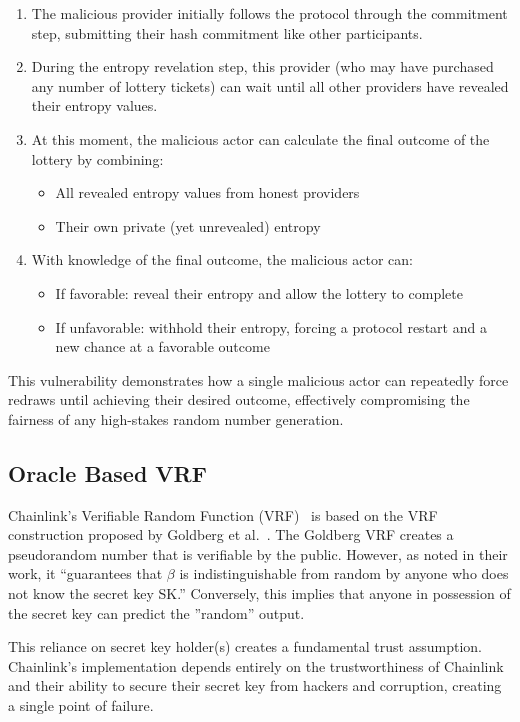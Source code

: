 \begin{enumerate}
    \item The malicious provider initially follows the protocol through the commitment step, submitting their hash commitment like other participants.
    
    \item During the entropy revelation step, this provider (who may have purchased any number of lottery tickets) can wait until all other providers have revealed their entropy values.
    
    \item At this moment, the malicious actor can calculate the final outcome of the lottery by combining:
    \begin{itemize}
        \item All revealed entropy values from honest providers
        \item Their own private (yet unrevealed) entropy
    \end{itemize}
    
    \item With knowledge of the final outcome, the malicious actor can:
    \begin{itemize}
        \item If favorable: reveal their entropy and allow the lottery to complete
        \item If unfavorable: withhold their entropy, forcing a protocol restart and a new chance at a favorable outcome
    \end{itemize}
\end{enumerate}

This vulnerability demonstrates how a single malicious actor can repeatedly force redraws until achieving their desired outcome, effectively compromising the fairness of any high-stakes random number generation.


\subsection{Oracle Based VRF}\label{sec:oracle_based_vrf}
Chainlink's Verifiable Random Function (VRF)~\cite{chainlink_vrf} is based on the VRF construction proposed by Goldberg et al.~\cite{goldbergVRF}. The Goldberg VRF creates a pseudorandom number that is verifiable by the public. However, as noted in their work, it ``guarantees that $\beta$ is indistinguishable from random by anyone who does not know the secret key SK.'' Conversely, this implies that anyone in possession of the secret key can predict the ''random'' output.

This reliance on secret key holder(s) creates a fundamental trust assumption. Chainlink's implementation depends entirely on the trustworthiness of Chainlink and their ability to secure their secret key from hackers and corruption, creating a single point of failure.
